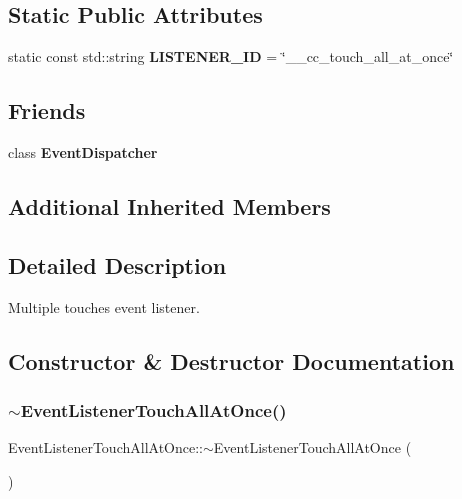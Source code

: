\subsection*{Static Public Attributes}
\begin{DoxyCompactItemize}
\item 
\mbox{\label{classEventListenerTouchAllAtOnce_aeed4ec727ef835cf99f4dd22e68762f1}} 
static const std\+::string {\bfseries L\+I\+S\+T\+E\+N\+E\+R\+\_\+\+ID} = \char`\"{}\+\_\+\+\_\+cc\+\_\+touch\+\_\+all\+\_\+at\+\_\+once\char`\"{}
\end{DoxyCompactItemize}
\subsection*{Friends}
\begin{DoxyCompactItemize}
\item 
\mbox{\label{classEventListenerTouchAllAtOnce_a7de0ed02fc316d9e73b7eb3def69c105}} 
class {\bfseries Event\+Dispatcher}
\end{DoxyCompactItemize}
\subsection*{Additional Inherited Members}


\subsection{Detailed Description}
Multiple touches event listener. 

\subsection{Constructor \& Destructor Documentation}
\mbox{\label{classEventListenerTouchAllAtOnce_aab17a8eb01a1e36240f83a7410bfc343}} 
\subsubsection{\texorpdfstring{$\sim$\+Event\+Listener\+Touch\+All\+At\+Once()}{~EventListenerTouchAllAtOnce()}\hspace{0.1cm}{\footnotesize\ttfamily [1/2]}}
{\footnotesize\ttfamily Event\+Listener\+Touch\+All\+At\+Once\+::$\sim$\+Event\+Listener\+Touch\+All\+At\+Once (\begin{DoxyParamCaption}{ }\end{DoxyParamCaption})\hspace{0.3cm}{\ttfamily [virtual]}}

